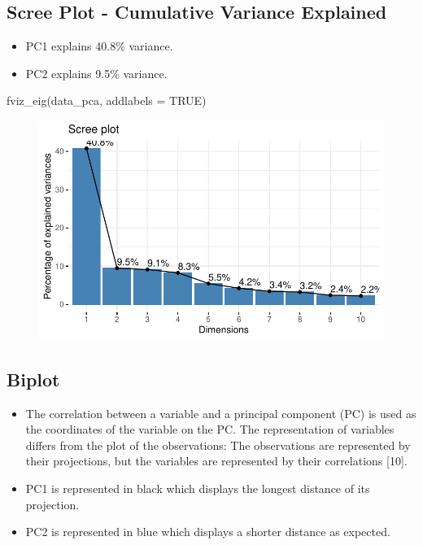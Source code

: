 \documentclass[
  letterpaper,
  DIV=11,
  numbers=noendperiod]{scrreprt}
\newenvironment{Shaded}{\begin{snugshade}}{\end{snugshade}}
\newcommand{\AttributeTok}[1]{\textcolor[rgb]{0.40,0.45,0.13}{#1}}
\newcommand{\ConstantTok}[1]{\textcolor[rgb]{0.56,0.35,0.01}{#1}}
\newcommand{\FunctionTok}[1]{\textcolor[rgb]{0.28,0.35,0.67}{#1}}
\newcommand{\NormalTok}[1]{\textcolor[rgb]{0.00,0.23,0.31}{#1}}
\begin{document}
\hypertarget{scree-plot---cumulative-variance-explained-1}{%
\subsection{Scree Plot - Cumulative Variance
Explained}\label{scree-plot---cumulative-variance-explained-1}}

\begin{itemize}
\item
  PC1 explains 40.8\% variance.
\item
  PC2 explains 9.5\% variance.
\end{itemize}

\begin{Shaded}
\begin{Highlighting}[]
\FunctionTok{fviz\_eig}\NormalTok{(data\_pca, }\AttributeTok{addlabels =} \ConstantTok{TRUE}\NormalTok{)}
\end{Highlighting}
\end{Shaded}

\begin{figure}[H]

{\centering \includegraphics{analysis_files/figure-pdf/unnamed-chunk-21-1.pdf}

}

\end{figure}

\hypertarget{biplot-1}{%
\subsection{Biplot}\label{biplot-1}}

\begin{itemize}
\item
  The correlation between a variable and a principal component (PC) is
  used as the coordinates of the variable on the PC. The representation
  of variables differs from the plot of the observations: The
  observations are represented by their projections, but the variables
  are represented by their correlations {[}10{]}.
\item
  PC1 is represented in black which displays the longest distance of its
  projection.
\item
  PC2 is represented in blue which displays a shorter distance as
  expected.
\end{itemize}
\end{document}
